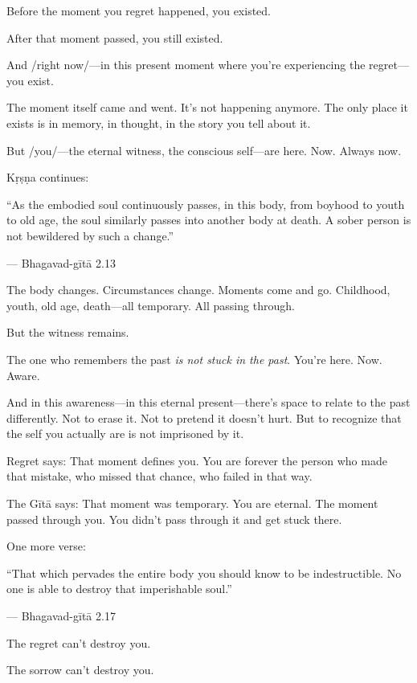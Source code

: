 \documentclass[11pt,twoside]{book}
\begin{document}
Before the moment you regret happened, you existed.

After that moment passed, you still existed.

And /right now/—in this present moment where you're experiencing the regret—you exist.

The moment itself came and went. It's not happening anymore. The only place it exists is in memory, in thought, in the story you tell about it.

But /you/—the eternal witness, the conscious self—are here. Now. Always now.

Kṛṣṇa continues:

\begin{pullquote}
``As the embodied soul continuously passes, in this body, from boyhood to youth to old age, the soul similarly passes into another body at death. A sober person is not bewildered by such a change.''

--- Bhagavad-gītā 2.13
\end{pullquote}

The body changes. Circumstances change. Moments come and go. Childhood, youth, old age, death—all temporary. All passing through.

But the witness remains.

The one who remembers the past \emph{is not stuck in the past}. You're here. Now. Aware.

And in this awareness—in this eternal present—there's space to relate to the past differently. Not to erase it. Not to pretend it doesn't hurt. But to recognize that the self you actually are is not imprisoned by it.

Regret says: That moment defines you. You are forever the person who made that mistake, who missed that chance, who failed in that way.

The Gītā says: That moment was temporary. You are eternal. The moment passed through you. You didn't pass through it and get stuck there.

One more verse:

\begin{pullquote}
``That which pervades the entire body you should know to be indestructible. No one is able to destroy that imperishable soul.''

--- Bhagavad-gītā 2.17
\end{pullquote}

The regret can't destroy you.

The sorrow can't destroy you.
\end{document}
